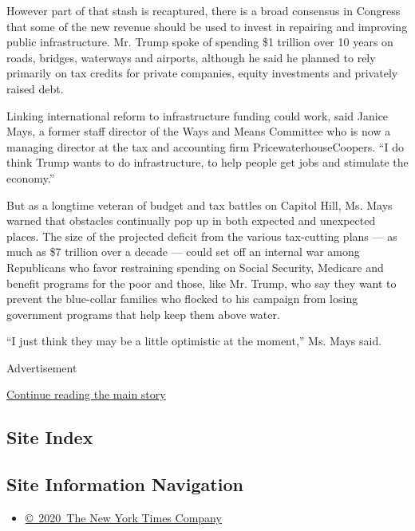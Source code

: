 However part of that stash is recaptured, there is a broad consensus in
Congress that some of the new revenue should be used to invest in
repairing and improving public infrastructure. Mr. Trump spoke of
spending \$1 trillion over 10 years on roads, bridges, waterways and
airports, although he said he planned to rely primarily on tax credits
for private companies, equity investments and privately raised debt.

Linking international reform to infrastructure funding could work, said
Janice Mays, a former staff director of the Ways and Means Committee who
is now a managing director at the tax and accounting firm
PricewaterhouseCoopers. ``I do think Trump wants to do infrastructure,
to help people get jobs and stimulate the economy.''

But as a longtime veteran of budget and tax battles on Capitol Hill, Ms.
Mays warned that obstacles continually pop up in both expected and
unexpected places. The size of the projected deficit from the various
tax-cutting plans --- as much as \$7 trillion over a decade --- could
set off an internal war among Republicans who favor restraining spending
on Social Security, Medicare and benefit programs for the poor and
those, like Mr. Trump, who say they want to prevent the blue-collar
families who flocked to his campaign from losing government programs
that help keep them above water.

``I just think they may be a little optimistic at the moment,'' Ms. Mays
said.

Advertisement

\protect\hyperlink{after-bottom}{Continue reading the main story}

\hypertarget{site-index}{%
\subsection{Site Index}\label{site-index}}

\hypertarget{site-information-navigation}{%
\subsection{Site Information
Navigation}\label{site-information-navigation}}

\begin{itemize}
\tightlist
\item
  \href{https://help.nytimes.com/hc/en-us/articles/115014792127-Copyright-notice}{©~2020~The
  New York Times Company}
\end{itemize}

